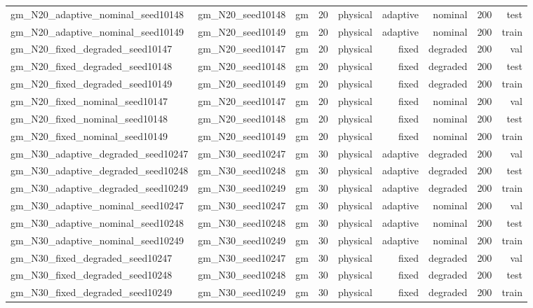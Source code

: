 \begin{tabular}{lrrrrrrrr}
gm\_N20\_adaptive\_nominal\_seed10148 & gm\_N20\_seed10148 & gm & 20 & physical & adaptive & nominal & 200 & test \\
gm\_N20\_adaptive\_nominal\_seed10149 & gm\_N20\_seed10149 & gm & 20 & physical & adaptive & nominal & 200 & train \\
gm\_N20\_fixed\_degraded\_seed10147 & gm\_N20\_seed10147 & gm & 20 & physical & fixed & degraded & 200 & val \\
gm\_N20\_fixed\_degraded\_seed10148 & gm\_N20\_seed10148 & gm & 20 & physical & fixed & degraded & 200 & test \\
gm\_N20\_fixed\_degraded\_seed10149 & gm\_N20\_seed10149 & gm & 20 & physical & fixed & degraded & 200 & train \\
gm\_N20\_fixed\_nominal\_seed10147 & gm\_N20\_seed10147 & gm & 20 & physical & fixed & nominal & 200 & val \\
gm\_N20\_fixed\_nominal\_seed10148 & gm\_N20\_seed10148 & gm & 20 & physical & fixed & nominal & 200 & test \\
gm\_N20\_fixed\_nominal\_seed10149 & gm\_N20\_seed10149 & gm & 20 & physical & fixed & nominal & 200 & train \\
gm\_N30\_adaptive\_degraded\_seed10247 & gm\_N30\_seed10247 & gm & 30 & physical & adaptive & degraded & 200 & val \\
gm\_N30\_adaptive\_degraded\_seed10248 & gm\_N30\_seed10248 & gm & 30 & physical & adaptive & degraded & 200 & test \\
gm\_N30\_adaptive\_degraded\_seed10249 & gm\_N30\_seed10249 & gm & 30 & physical & adaptive & degraded & 200 & train \\
gm\_N30\_adaptive\_nominal\_seed10247 & gm\_N30\_seed10247 & gm & 30 & physical & adaptive & nominal & 200 & val \\
gm\_N30\_adaptive\_nominal\_seed10248 & gm\_N30\_seed10248 & gm & 30 & physical & adaptive & nominal & 200 & test \\
gm\_N30\_adaptive\_nominal\_seed10249 & gm\_N30\_seed10249 & gm & 30 & physical & adaptive & nominal & 200 & train \\
gm\_N30\_fixed\_degraded\_seed10247 & gm\_N30\_seed10247 & gm & 30 & physical & fixed & degraded & 200 & val \\
gm\_N30\_fixed\_degraded\_seed10248 & gm\_N30\_seed10248 & gm & 30 & physical & fixed & degraded & 200 & test \\
gm\_N30\_fixed\_degraded\_seed10249 & gm\_N30\_seed10249 & gm & 30 & physical & fixed & degraded & 200 & train \\

\end{tabular}

